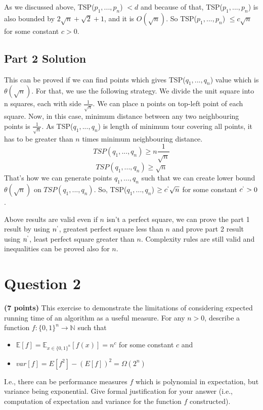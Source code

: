 \documentclass{article}
\begin{document}
As we discussed above, TSP($p_1,...,p_n$) $< d$ and because of that, TSP($p_1,...,p_n$) is also bounded by  $2\sqrt{n}+\sqrt{2}+1$, and it is $O(\sqrt{n})$. So TSP($p_1,...,p_n$) $\leq c\sqrt{n}$ for some constant $c >0$.

\subsection*{Part 2 Solution}
\hspace{8mm}This can be proved if we can find points which gives TSP($q_1,...,q_n$) value which is $\theta(\sqrt{n})$. For that, we use the following strategy. We divide the unit square into n squares, each with side $\frac{1}{\sqrt{n}}$. We can place n points on top-left point of each square. Now, in this case, minimum distance between any two neighbouring points is $\frac{1}{\sqrt{n}}$. As TSP($q_1,...,q_n$) is length of minimum tour covering all points, it has to be greater than $n$ times minimum neighbouring distance.
$$TSP(q_1,...,q_n) \geq n\frac{1}{\sqrt{n}}$$
$$TSP(q_1,...,q_n) \geq \sqrt{n}$$
That's how we can generate points $q_1,...,q_n$ such that we can create lower bound $\theta(\sqrt{n})$ on $TSP(q_1,...,q_n)$. So, TSP($q_1,...,q_n$) $\geq c^`\sqrt{n}$ for some constant $c^` >0$.
\\
\par Above results are valid even if $n$ isn't a perfect square, we can prove the part 1 result by using $n^`$, greatest perfect square less than $n$ and prove part 2 result using $n^`$, least perfect square greater than $n$. Complexity rules are still valid and inequalities can be proved also for $n$.
\newpage
\section*{Question 2}
\textbf{(7 points)} This exercise to demonstrate the limitations of considering expected running
time of an algorithm as a useful measure. For any $n > 0$, describe a function $f : \{0, 1\}^n \rightarrow \mathbb{N} $ such that
\begin{itemize}
    \item $\mathbb{E}[f] = \mathbb{E}_{x \in \{0, 1\}^n}[f(x)] = n^c$ for some constant $c$ and
    \item $var[f] = E[f^2]-(E[f])^2 = \Omega(2^n)$
\end{itemize}
I.e., there can be performance measures $f$ which is polynomial in expectation, but variance being exponential. Give formal justification for your answer (i.e., computation of
expectation and variance for the function $f$ constructed).
\end{document}
